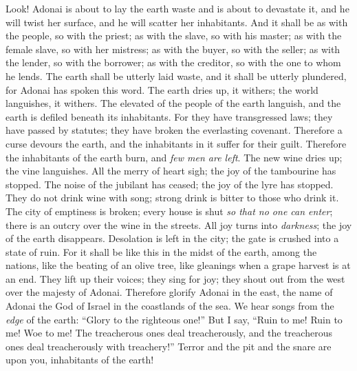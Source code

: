 \begin{biblechapter} %
 Look! Adonai is about to lay the earth waste 
and is about to devastate it, 
and he will twist her surface, 
and he will scatter her inhabitants.
\verse And it shall be as with the people, so with the priest; 
as with the slave, so with his master; 
as with the female slave, so with her mistress; 
as with the buyer, so with the seller; 
as with the lender, so with the borrower; 
as with the creditor, so with the one to whom he lends.
\verse The earth shall be utterly laid waste, 
and it shall be utterly plundered, for Adonai has spoken this word.
\verse The earth dries up, it withers; 
the world languishes, it withers. 
The elevated of the people of the earth languish,
\verse and the earth is defiled beneath its inhabitants. 
For they have transgressed laws; 
they have passed by statutes; 
they have broken the everlasting covenant.
\verse Therefore a curse devours the earth, 
and the inhabitants in it suffer for their guilt. 
Therefore the inhabitants of the earth burn, 
and \textit{few men are left}.
\verse The new wine dries up; 
the vine languishes. 
All the merry of heart sigh;
\verse the joy of the tambourine has stopped. 
The noise of the jubilant has ceased; 
the joy of the lyre has stopped.
\verse They do not drink wine with song; 
strong drink is bitter to those who drink it.
\verse The city of emptiness is broken; 
every house is shut \textit{so that no one can enter};
\verse there is an outcry over the wine in the streets. 
All joy turns into \textit{darkness}; 
the joy of the earth disappears.
\verse Desolation is left in the city; 
the gate is crushed into a state of ruin.
\verse For it shall be like this in the midst of the earth, 
among the nations, 
like the beating of an olive tree, 
like gleanings when a grape harvest is at an end.
\verse They lift up their voices; they sing for joy; 
they shout out from the west over the majesty of Adonai.
\verse Therefore glorify Adonai in the east, 
the name of Adonai the God of Israel in the coastlands of the sea.
\verse We hear songs from the \textit{edge} of the earth: 
“Glory to the righteous one!” 
But I say, “Ruin to me! 
Ruin to me! Woe to me! 
The treacherous ones deal treacherously, 
and the treacherous ones deal treacherously with treachery!”
\verse Terror and the pit and the snare are upon you, inhabitants of the earth!

\end{biblechapter}
